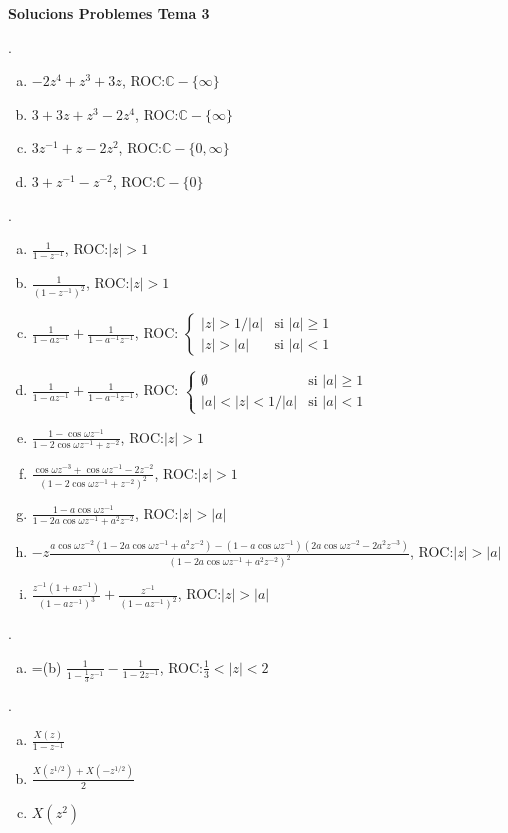\documentclass{article}
\newcommand\C{\mathbb{C}}
\begin{document}
\textbf{\Large Solucions Problemes Tema 3}

\vskip 1cm

.
\begin{enumerate}[(a)]
\item $-2z^4+z^3+3z$, ROC:$\C-\{\infty\}$
\item $3+3z+z^3-2z^4$, ROC:$\C-\{\infty\}$
\item $3z^{-1}+z-2z^2$, ROC:$\C-\{0, \infty\}$
\item $3+z^{-1}-z^{-2}$, ROC:$\C-\{0\}$
\end{enumerate}

.
\begin{enumerate}[(a)]
\item $\displaystyle \frac{1}{1-z^{-1}}$, ROC:$|z|>1$
\item $\displaystyle \frac{1}{(1-z^{-1})^2}$, ROC:$|z|>1$
\item $\displaystyle \frac{1}{1-az^{-1}}+\frac{1}{1-a^{-1}z^{-1}}$, 
ROC: $\begin{cases} |z|>1/|a| & \text{si } |a|\geq 1 \\ |z|>|a| & \text{si } |a|<1 \end{cases}$
\item $\displaystyle \frac{1}{1-az^{-1}}+\frac{1}{1-a^{-1}{z^{-1}}}$, 
ROC: $\begin{cases} \emptyset & \text{si } |a|\geq 1 \\ |a|<|z|<1/|a| & \text{si } |a|<1 \end{cases}$
\item $\displaystyle \frac{1-\cos\omega z^{-1}}{1-2\cos\omega z^{-1}+z^{-2}}$, ROC:$|z|>1$
\item $\displaystyle \frac{\cos\omega z^{-3}+\cos\omega z^{-1}-2z^{-2}}{(1-2\cos\omega z^{-1}+z^{-2})^2}$,
ROC:$|z|>1$
\item $\displaystyle \frac{1-a\cos\omega z^{-1}}{1-2a\cos\omega z^{-1}+a^2z^{-2}}$, ROC:$|z|>|a|$
\item $\displaystyle -z \frac{a\cos\omega z^{-2}(1-2a\cos\omega z^{-1}+a^2 z^{-2})-(1-a\cos\omega z^{-1})
(2a\cos\omega z^{-2}-2a^2 z^{-3})}{(1-2a\cos\omega z^{-1}+a^2 z^{-2})^2}$, ROC:$|z|>|a|$
\item $\displaystyle \frac{z^{-1}(1+az^{-1})}{(1-az^{-1})^3}+\frac{z^{-1}}{(1-az^{-1})^2}$, ROC:$|z|>|a|$
\end{enumerate}

.
\begin{enumerate}[(a)]
\item =(b) $\displaystyle \frac{1}{1-\frac{1}{3}z^{-1}} - \frac{1}{1-2z^{-1}}$, ROC:$\frac{1}{3}<|z|<2$
\end{enumerate}

.
\begin{enumerate}[(a)]
\item $\displaystyle \frac{X(z)}{1-z^{-1}}$
\item $\displaystyle \frac{X(z^{1/2})+X(-z^{1/2})}{2}$
\item $X(z^2)$
\end{enumerate}
\end{document}
